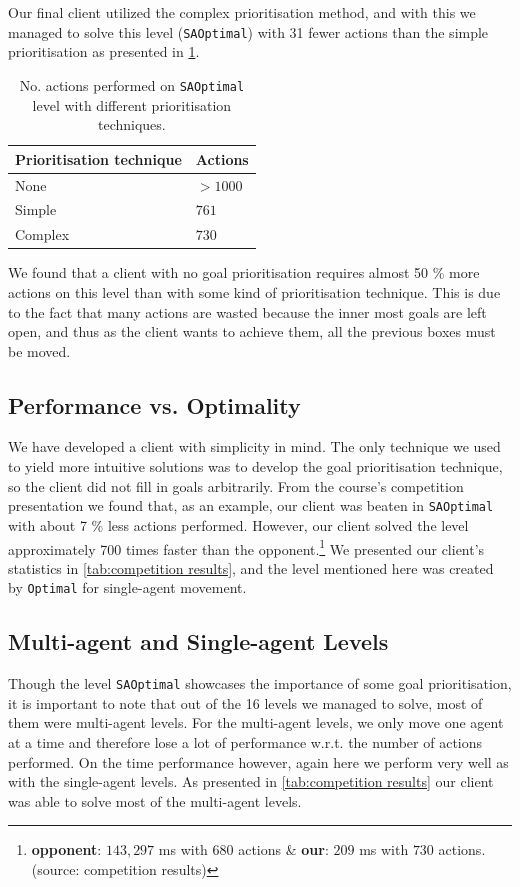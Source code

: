 Our final client utilized the complex prioritisation method, and with this we managed to solve this level (\texttt{SAOptimal}) with 31 fewer actions than the simple prioritisation as presented in \cref{tab:SAOptimal_results}.

\begin{table}[h!]
  \centering
  \begin{tabular}{@{}ll@{}}
    \toprule
    Prioritisation technique & Actions \\
    \midrule
    None    & $>1000$ \\
    Simple  & $761$ \\
    Complex & $730$ \\
    \bottomrule
  \end{tabular}
  \caption{\label{tab:SAOptimal_results}No. actions performed on \texttt{SAOptimal} level with different prioritisation techniques.}
\end{table}

We found that a client with no goal prioritisation requires almost 50 \% more actions on this level than with some kind of prioritisation technique.
This is due to the fact that many actions are wasted because the inner most goals are left open, and thus as the client wants to achieve them, all the previous boxes must be moved.

\subsection{Performance vs. Optimality}
\label{sec:performance vs. optimality}

We have developed a client with simplicity in mind.
The only technique we used to yield more intuitive solutions was to develop the goal prioritisation technique, so the client did not fill in goals arbitrarily.
From the course's competition presentation we found that, as an example, our client was beaten in \texttt{SAOptimal} with about 7 \% less actions performed.
However, our client solved the level approximately 700 times faster than the opponent.\footnote{\textbf{opponent}: $143{,}297$ ms with $680$ actions \& \textbf{our}: $209$ ms with $730$ actions. (source: competition results)}
We presented our client's statistics in \cref{tab:competition results}, and the level mentioned here was created by \texttt{Optimal} for single-agent movement.

\subsection{Multi-agent and Single-agent Levels}

Though the level \texttt{SAOptimal} showcases the importance of some goal prioritisation, it is important to note that out of the 16 levels we managed to solve, most of them were multi-agent levels. For the multi-agent levels, we only move one agent at a time and therefore lose a lot of performance w.r.t. the number of actions performed.
On the time performance however, again here we perform very well as with the single-agent levels.
As presented in \cref{tab:competition results} our client was able to solve most of the multi-agent levels.

